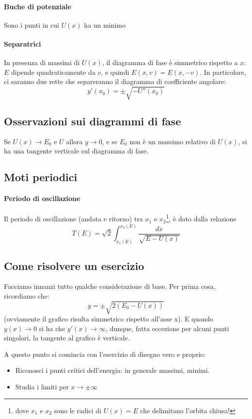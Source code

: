 \documentclass[a4paper,12pt]{article}
\begin{document}
\paragraph{Buche di potenziale}
Sono i punti in cui $U(x)$ ha un minimo
\paragraph{Separatrici}
In presenza di massimi di $U(x)$, il diagramma di fase è simmetrico rispetto a $x$: $E$ dipende quadraticamente da $v$, e quindi $E(x, v) = E(x, -v)$.
In particolare, ci saranno due rette che separeranno il diagramma di coefficiente angolare:
$$y'(x_0) = \pm\sqrt{-U''(x_0)}$$

\subsection{Osservazioni sui diagrammi di fase}
Se $U(x) \to E_0$ e $U$ allora $y \to 0$, e se $E_0$ non è un massimo relativo di $U(x)$, si ha una tangente verticale sul diagramma di fase.


\subsection{Moti periodici}
\paragraph{Periodo di oscillazione}
Il periodo di oscillazione (andata e ritorno) tra $x_1$ e $x_2$\footnote{dove $x_1$ e $x_2$ sono le radici di $U(x) = E $ che delimitano l'orbita chiusa! }, è dato dalla relazione
$$ T(E) = \sqrt{2}\int_{x_1(E)}^{x_2(E)} \dfrac{dx}{\sqrt{E-U(x)}}$$

\subsection{Come risolvere un esercizio}
Facciamo innanzi tutto qualche considerazione di base. Per prima cosa, ricordiamo che:
$$y = \pm \sqrt{2(E_0-U(x))}$$
    (ovviamente il grafico risulta simmetrico rispetto all'asse x).
E quando $y(x)\to 0$ si ha che $y'(x) \to \infty$, dunque, fatta eccezione per alcuni punti singolari, la tangente al grafico è verticale.

A questo punto si comincia con l'esercizio di disegno vero e proprio:
\begin{itemize}
 \item Riconosci i punti critici dell'energia: in generale massimi, minimi.
 \item Studia i limiti per $x\to\pm\infty$

\end{itemize}
\end{document}
